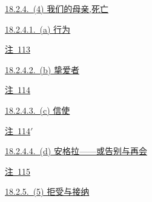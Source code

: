 \par\noindent\hspace*{1.35em}\hyperref[ch18:local:h16]{18.2.4.~(4) 我们的母亲,死亡}\nobreak\dotfill\nobreak\hyperref[ch18:local:h16]{\pageref*{ch18:local:h16}}\par
\par\noindent\hspace*{2.70em}\hyperref[ch18:local:h17]{18.2.4.1.~(a) 行为}\nobreak\dotfill\nobreak\hyperref[ch18:local:h17]{\pageref*{ch18:local:h17}}\par
\par\noindent\hspace*{4.05em}\hyperref[ch18:local:n15]{注~113}\nobreak\dotfill\nobreak\hyperref[ch18:local:n15]{\pageref*{ch18:local:n15}}\par
\par\noindent\hspace*{2.70em}\hyperref[ch18:local:h18]{18.2.4.2.~(b) 挚爱者}\nobreak\dotfill\nobreak\hyperref[ch18:local:h18]{\pageref*{ch18:local:h18}}\par
\par\noindent\hspace*{4.05em}\hyperref[ch18:local:n16]{注~114}\nobreak\dotfill\nobreak\hyperref[ch18:local:n16]{\pageref*{ch18:local:n16}}\par
\par\noindent\hspace*{2.70em}\hyperref[ch18:local:h19]{18.2.4.3.~(c) 信使}\nobreak\dotfill\nobreak\hyperref[ch18:local:h19]{\pageref*{ch18:local:h19}}\par
\par\noindent\hspace*{4.05em}\hyperref[ch18:local:n17]{注~114$'$}\nobreak\dotfill\nobreak\hyperref[ch18:local:n17]{\pageref*{ch18:local:n17}}\par
\par\noindent\hspace*{2.70em}\hyperref[ch18:local:h20]{18.2.4.4.~(d) 安格拉——或告别与再会}\nobreak\dotfill\nobreak\hyperref[ch18:local:h20]{\pageref*{ch18:local:h20}}\par
\par\noindent\hspace*{4.05em}\hyperref[ch18:local:n18]{注~115}\nobreak\dotfill\nobreak\hyperref[ch18:local:n18]{\pageref*{ch18:local:n18}}\par
\par\noindent\hspace*{1.35em}\hyperref[ch18:local:h21]{18.2.5.~(5) 拒受与接纳}\nobreak\dotfill\nobreak\hyperref[ch18:local:h21]{\pageref*{ch18:local:h21}}\par
